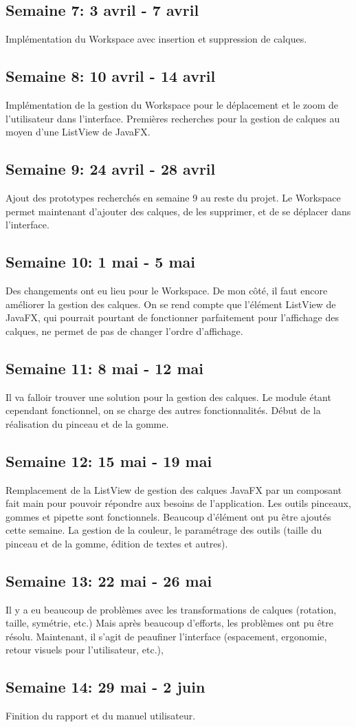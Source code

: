 \subsection{Semaine 7: 3 avril - 7 avril}
Implémentation du Workspace avec insertion et suppression de calques.
\subsection{Semaine 8: 10 avril - 14 avril}
Implémentation de la gestion du Workspace pour le déplacement et le zoom de l'utilisateur dans l'interface. Premières recherches pour la gestion de calques au moyen d'une ListView de JavaFX.
\subsection{Semaine 9: 24 avril - 28 avril}
Ajout des prototypes recherchés en semaine 9 au reste du projet. Le Workspace permet maintenant d'ajouter des calques, de les supprimer, et de se déplacer dans l'interface. 
\subsection{Semaine 10: 1 mai - 5 mai}
Des changements ont eu lieu pour le Workspace. De mon côté, il faut encore améliorer la gestion des calques.
On se rend compte que l'élément ListView de JavaFX, qui pourrait pourtant de fonctionner parfaitement pour l'affichage des calques, ne permet de pas de changer l'ordre d'affichage.
\subsection{Semaine 11: 8 mai - 12 mai} 
Il va falloir trouver une solution pour la gestion des calques. Le module étant cependant fonctionnel, on se charge des autres fonctionnalités. Début de la réalisation du pinceau et de la gomme.
\subsection{Semaine 12: 15 mai - 19 mai}
Remplacement de la ListView de gestion des calques JavaFX par un composant fait main pour pouvoir répondre aux besoins de l'application. Les outils pinceaux, gommes et pipette sont fonctionnels. Beaucoup d'élément ont pu être ajoutés cette semaine. La gestion de la couleur, le paramétrage des outils (taille du pinceau et de la gomme, édition de textes et autres).
\subsection{Semaine 13: 22 mai - 26 mai}
Il y a eu beaucoup de problèmes avec les transformations de calques (rotation, taille, symétrie, etc.) Mais après beaucoup d'efforts, les problèmes ont pu être résolu. Maintenant, il s'agit de peaufiner l'interface (espacement, ergonomie, retour visuels pour l'utilisateur, etc.),
\subsection{Semaine 14: 29 mai - 2 juin}
Finition du rapport et du manuel utilisateur.



